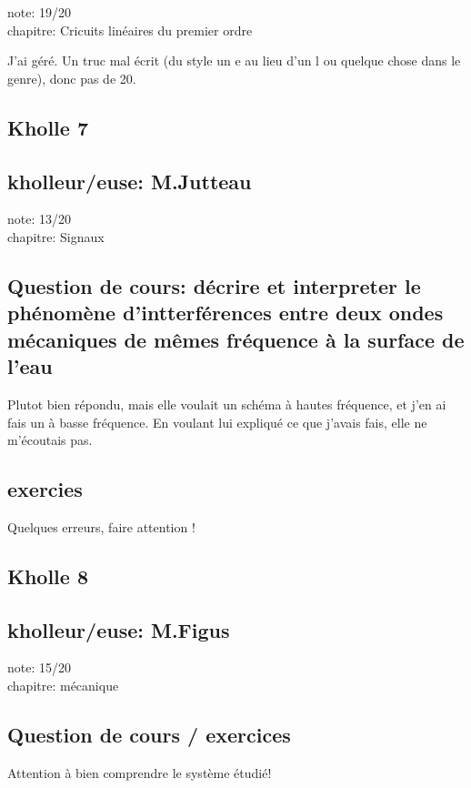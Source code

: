 \documentclass{article}
\begin{document}
note: 19/20 \\
chapitre: Cricuits linéaires du premier ordre

J'ai géré. Un truc mal écrit (du style un e au lieu d'un l ou quelque chose dans le genre), donc pas de 20.


\subsection{Kholle 7}
\subsection{kholleur/euse: M.Jutteau}

note: 13/20 \\
chapitre: Signaux

\subsection{Question de cours: décrire et interpreter le phénomène d'intterférences entre deux ondes mécaniques de mêmes fréquence à la surface de l'eau}

Plutot bien répondu, mais elle voulait un schéma à hautes fréquence, et j'en ai fais un à basse fréquence. En voulant lui expliqué ce que j'avais fais, elle ne m'écoutais pas. \\

\subsection{exercies}

Quelques erreurs, faire attention !

\subsection{Kholle 8}
\subsection{kholleur/euse: M.Figus}

note: 15/20 \\
chapitre: mécanique

\subsection{Question de cours / exercices}

Attention à  bien comprendre le système étudié! \\
\end{document}
